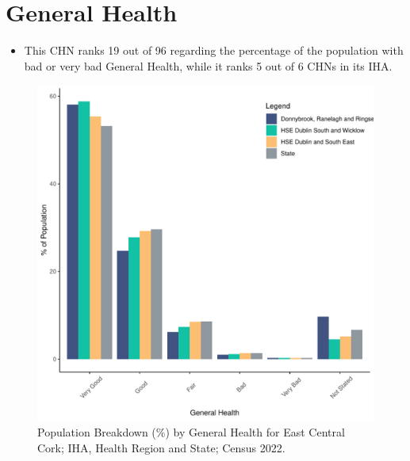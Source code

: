 \documentclass{article}
\begin{document}
\pagebreak

\section{General Health}\label{sect:GenHealth}
\begin{itemize}
\item  This CHN ranks  19 out of 96 regarding the percentage of the population with bad or very bad General Health, while it ranks   5 out of 6 CHNs in its IHA.
\end{itemize}
\begin{figure}[h]
	\centering
	\includegraphics[width = 150mm]{../figures/GenED.pdf}
	\caption{Population Breakdown (\%) by General Health for East Central Cork; IHA, Health Region and State;  Census 2022.}
	\label{fig:2ae19629-1a6a-13a3-e055-000000000001}
	\end{figure}
\end{document}
